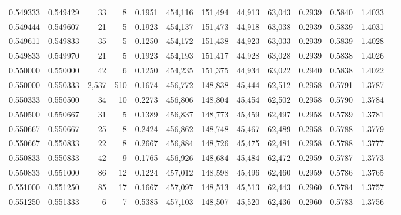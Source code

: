 \begin{tabular}{rrrrrrrrrrrrr}
0.549333 & 0.549429 &    33 &   8 &                                     0.1951 & 454,116 & 151,494 &  44,913 &  63,043 & 0.2939 & 0.5840 & 1.4033 \\
0.549444 & 0.549607 &    21 &   5 &                                     0.1923 & 454,137 & 151,473 &  44,918 &  63,038 & 0.2939 & 0.5839 & 1.4031 \\
0.549611 & 0.549833 &    35 &   5 &                                     0.1250 & 454,172 & 151,438 &  44,923 &  63,033 & 0.2939 & 0.5839 & 1.4028 \\
0.549833 & 0.549970 &    21 &   5 &                                     0.1923 & 454,193 & 151,417 &  44,928 &  63,028 & 0.2939 & 0.5838 & 1.4026 \\
0.550000 & 0.550000 &    42 &   6 &                                     0.1250 & 454,235 & 151,375 &  44,934 &  63,022 & 0.2940 & 0.5838 & 1.4022 \\
0.550000 & 0.550333 & 2,537 & 510 &                                     0.1674 & 456,772 & 148,838 &  45,444 &  62,512 & 0.2958 & 0.5791 & 1.3787 \\
0.550333 & 0.550500 &    34 &  10 &                                     0.2273 & 456,806 & 148,804 &  45,454 &  62,502 & 0.2958 & 0.5790 & 1.3784 \\
0.550500 & 0.550667 &    31 &   5 &                                     0.1389 & 456,837 & 148,773 &  45,459 &  62,497 & 0.2958 & 0.5789 & 1.3781 \\
0.550667 & 0.550667 &    25 &   8 &                                     0.2424 & 456,862 & 148,748 &  45,467 &  62,489 & 0.2958 & 0.5788 & 1.3779 \\
0.550667 & 0.550833 &    22 &   8 &                                     0.2667 & 456,884 & 148,726 &  45,475 &  62,481 & 0.2958 & 0.5788 & 1.3777 \\
0.550833 & 0.550833 &    42 &   9 &                                     0.1765 & 456,926 & 148,684 &  45,484 &  62,472 & 0.2959 & 0.5787 & 1.3773 \\
0.550833 & 0.551000 &    86 &  12 &                                     0.1224 & 457,012 & 148,598 &  45,496 &  62,460 & 0.2959 & 0.5786 & 1.3765 \\
0.551000 & 0.551250 &    85 &  17 &                                     0.1667 & 457,097 & 148,513 &  45,513 &  62,443 & 0.2960 & 0.5784 & 1.3757 \\
0.551250 & 0.551333 &     6 &   7 &                                     0.5385 & 457,103 & 148,507 &  45,520 &  62,436 & 0.2960 & 0.5783 & 1.3756 \\

\end{tabular}
